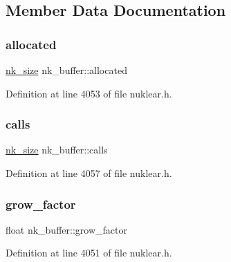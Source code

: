\subsection{Member Data Documentation}
\mbox{\label{structnk__buffer_a91e9be62aa08687400bc00059825de02}} 
\subsubsection{\texorpdfstring{allocated}{allocated}}
{\footnotesize\ttfamily \mbox{\hyperlink{nuklear_8h_a84c0fc50dec5501be327b33d41d9010c}{nk\+\_\+size}} nk\+\_\+buffer\+::allocated}



Definition at line 4053 of file nuklear.\+h.

\mbox{\label{structnk__buffer_acd962a6e042a8ffabac679768e4851bb}} 
\subsubsection{\texorpdfstring{calls}{calls}}
{\footnotesize\ttfamily \mbox{\hyperlink{nuklear_8h_a84c0fc50dec5501be327b33d41d9010c}{nk\+\_\+size}} nk\+\_\+buffer\+::calls}



Definition at line 4057 of file nuklear.\+h.

\mbox{\label{structnk__buffer_ab4ec59165f6aa6e9358bced8070cc84e}} 
\subsubsection{\texorpdfstring{grow\+\_\+factor}{grow\_factor}}
{\footnotesize\ttfamily float nk\+\_\+buffer\+::grow\+\_\+factor}



Definition at line 4051 of file nuklear.\+h.

\mbox{\label{structnk__buffer_aaa4beec86444feb7908aad98c20b6849}} 
